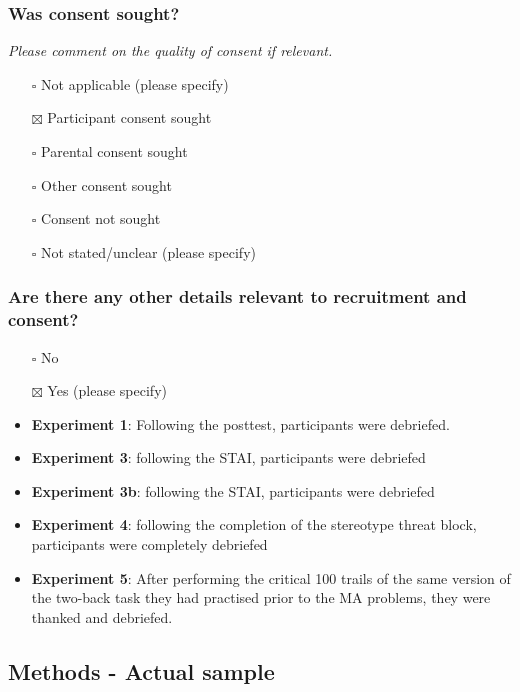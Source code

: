 \documentclass[
  doc, a4paper]{apa7}
\providecommand{\tightlist}{%
  \setlength{\itemsep}{0pt}\setlength{\parskip}{0pt}}
\begin{document}
\subsubsection{Was consent sought?}\label{was-consent-sought}

\emph{Please comment on the quality of consent if relevant.}

\begin{itemize}
\tightlist
\item[$\square$]
  Not applicable (please specify)
\item[$\boxtimes$]
  Participant consent sought
\item[$\square$]
  Parental consent sought
\item[$\square$]
  Other consent sought
\item[$\square$]
  Consent not sought
\item[$\square$]
  Not stated/unclear (please specify)
\end{itemize}

\subsubsection{Are there any other details relevant to recruitment and consent?}\label{are-there-any-other-details-relevant-to-recruitment-and-consent}

\begin{itemize}
\item[$\square$]
  No
\item[$\boxtimes$]
  Yes (please specify)
\item
  \textbf{Experiment 1}: Following the posttest, participants were debriefed.\\
\item
  \textbf{Experiment 3}: following the STAI, participants were debriefed
\item
  \textbf{Experiment 3b}: following the STAI, participants were debriefed
\item
  \textbf{Experiment 4}: following the completion of the stereotype threat block, participants were completely debriefed
\item
  \textbf{Experiment 5}: After performing the critical 100 trails of the same version of the two-back task they had practised prior to the MA problems, they were thanked and debriefed.
\end{itemize}

\subsection{Methods - Actual sample}\label{methods---actual-sample}
\end{document}
